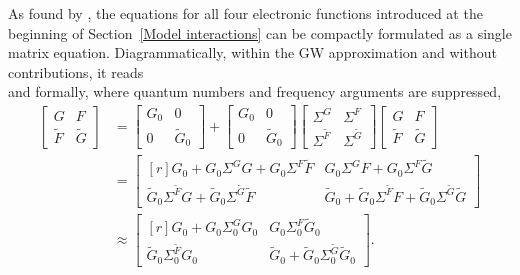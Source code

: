 As found by  \cite{Nambu60}, the  equations for all four
electronic  functions introduced at the beginning of
Section~\ref{Model interactions} can be compactly formulated as a single matrix
equation. Diagrammatically, within the GW approximation and without
 contributions, it reads
%
\begin{equation*}
    
\end{equation*}
%
and formally, where quantum numbers and frequency arguments are suppressed,
%
\begin{equation} \label{Nambu-Dyson equation}
    \begin{split}
        \begin{bmatrix}
            G & F \\
            \widetilde F & \widetilde G
        \end{bmatrix}
        &=
        \begin{bmatrix}
            G_0 & 0 \\
            0 & \widetilde G_0
        \end{bmatrix}
        +
        \begin{bmatrix}
            G_0 & 0 \\
            0 & \widetilde G_0
        \end{bmatrix}
        \begin{bmatrix}
            \Sigma^G & \Sigma^F \\
            \Sigma^{\widetilde F} & \Sigma^{\widetilde G}
        \end{bmatrix}
        \begin{bmatrix}
            G & F \\
            \widetilde F & \widetilde G
        \end{bmatrix}
        \\
        &=
        \begin{bmatrix*}[r]
            G_0 + G_0 \Sigma^G G + G_0 \Sigma^F \widetilde F
            & G_0 \Sigma^G F + G_0 \Sigma^F \widetilde G \\
            \widetilde G_0 \Sigma^{\widetilde F} G
            + \widetilde G_0 \Sigma^{\widetilde G} \widetilde F
            & \widetilde G_0 + \widetilde G_0 \Sigma^{\widetilde F} F
            + \widetilde G_0 \Sigma^{\widetilde G} \widetilde G
        \end{bmatrix*}
        \\
        &\approx
        \begin{bmatrix*}[r]
            G_0 + G_0 \Sigma^G_0 G_0 & G_0 \Sigma^F_0 \widetilde G_0 \\
            \widetilde G_0 \Sigma^{\widetilde F}_0 G_0 & \widetilde G_0
            + \widetilde G_0 \Sigma^{\widetilde G}_0 \widetilde G_0
        \end{bmatrix*}.
    \end{split}
\end{equation}

